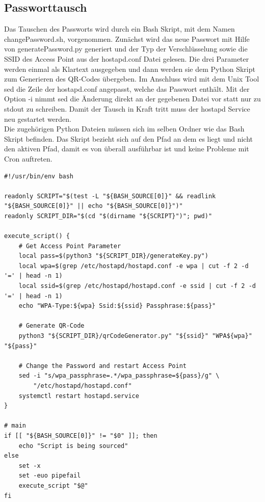 \documentclass[a4paper,11pt,singlespacing]{article}
\begin{document}
    	\subsection{Passworttausch}
    		Das Tauschen des Passworts wird durch ein Bash Skript, mit dem Namen changePassword.sh, vorgenommen. Zunächst wird das neue Passwort mit Hilfe von generatePassword.py generiert und der Typ der Verschlüsselung sowie die SSID des Access Point aus der hostapd.conf Datei gelesen. Die drei Parameter werden einmal als Klartext ausgegeben und dann werden sie dem Python Skript zum Generieren des QR-Codes übergeben. Im Anschluss wird mit dem Unix Tool sed die Zeile der hostapd.conf angepasst, welche das Passwort enthält. Mit der Option -i nimmt sed die Änderung direkt an der gegebenen Datei vor statt nur zu stdout zu schreiben. Damit der Tausch in Kraft tritt muss der hostapd Service neu gestartet werden. \\ 
    		Die zugehörigen Python Dateien müssen sich im selben Ordner wie das Bash Skript befinden. Das Skript bezieht sich auf den Pfad an dem es liegt und nicht den aktiven Pfad, damit es von überall ausführbar ist und keine Probleme mit Cron auftreten.  \\
    	\begin{lstlisting}
#!/usr/bin/env bash

readonly SCRIPT="$(test -L "${BASH_SOURCE[0]}" && readlink "${BASH_SOURCE[0]}" || echo "${BASH_SOURCE[0]}")"
readonly SCRIPT_DIR="$(cd "$(dirname "${SCRIPT}")"; pwd)"

execute_script() {
	# Get Access Point Parameter
	local pass=$(python3 "${SCRIPT_DIR}/generateKey.py")         
	local wpa=$(grep /etc/hostapd/hostapd.conf -e wpa | cut -f 2 -d '=' | head -n 1)
	local ssid=$(grep /etc/hostapd/hostapd.conf -e ssid | cut -f 2 -d '=' | head -n 1)
	echo "WPA-Type:${wpa} Ssid:${ssid} Passphrase:${pass}" 

	# Generate QR-Code
	python3 "${SCRIPT_DIR}/qrCodeGenerator.py" "${ssid}" "WPA${wpa}" "${pass}"

	# Change the Password and restart Access Point
	sed -i "s/wpa_passphrase=.*/wpa_passphrase=${pass}/g" \
		"/etc/hostapd/hostapd.conf"
	systemctl restart hostapd.service
}

# main
if [[ "${BASH_SOURCE[0]}" != "$0" ]]; then
	echo "Script is being sourced"
else
	set -x
	set -euo pipefail
	execute_script "$@"
fi  	
    	\end{lstlisting}
\end{document}
